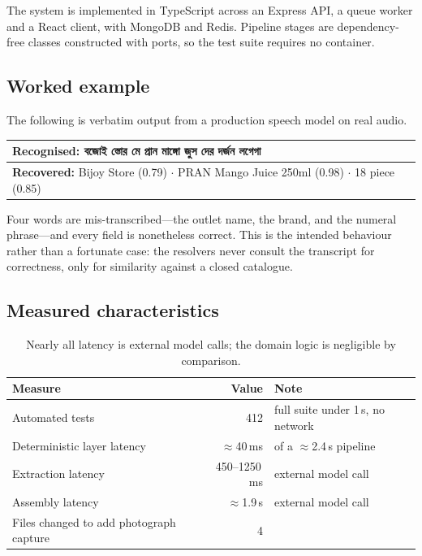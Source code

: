 \documentclass[11pt,a4paper]{article}
\newcommand{\bng}[1]{{\bn #1}}
\begin{document}
The system is implemented in TypeScript across an Express API, a queue worker
and a React client, with MongoDB and Redis. Pipeline stages are dependency-free
classes constructed with ports, so the test suite requires no container.

\subsection{Worked example}

The following is verbatim output from a production speech model on real audio.

\begin{center}\small
\begin{tabular}{@{}p{}@{}}
\toprule
\textbf{Recognised:} \bng{বজোই স্তোর মে প্রান মাঙ্গো জুস দের দর্জন লগেগা} \\
\midrule
\textbf{Recovered:} Bijoy Store (0.79) $\cdot$ PRAN Mango Juice 250ml (0.98) $\cdot$ 18 piece (0.85)\\
\bottomrule
\end{tabular}
\end{center}

Four words are mis-transcribed---the outlet name, the brand, and the numeral
phrase---and every field is nonetheless correct. This is the intended
behaviour rather than a fortunate case: the resolvers never consult the
transcript for correctness, only for similarity against a closed catalogue.

\subsection{Measured characteristics}

\begin{table}[h]
\centering\small
\begin{tabular}{@{}l r l@{}}
\toprule
\textbf{Measure} & \textbf{Value} & \textbf{Note} \\
\midrule
Automated tests & 412 & full suite under 1\,s, no network \\
Deterministic layer latency & $\approx$40\,ms & of a $\approx$2.4\,s pipeline \\
Extraction latency & 450--1250\,ms & external model call \\
Assembly latency & $\approx$1.9\,s & external model call \\
Files changed to add photograph capture & 4 & \\
\bottomrule
\end{tabular}
\caption{Nearly all latency is external model calls; the domain logic is negligible by comparison.}
\end{table}
\end{document}
